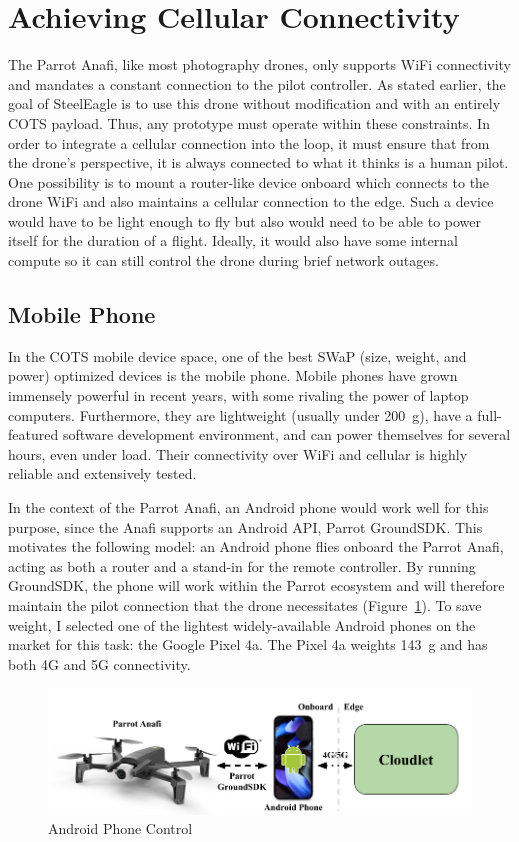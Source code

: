 \section{Achieving Cellular Connectivity}
\label{sec:achieving-cell-conn}
The Parrot Anafi, like most photography drones, only supports WiFi connectivity and mandates a constant connection to the pilot controller. As stated earlier, the goal of SteelEagle is to use this drone without modification and with an entirely COTS payload.  Thus, any prototype must operate within these constraints. In order to integrate a cellular connection into the loop, it must ensure that from the drone's perspective, it is always connected to what it thinks is a human pilot. One possibility is to mount a router-like device onboard which connects to the drone WiFi and also maintains a cellular connection to the edge. Such a device would have to be light enough to fly but also would need to be able to power itself for the duration of a flight. Ideally, it would also have some internal compute so it can still control the drone during brief network outages.

\subsection{Mobile Phone}
In the COTS mobile device space, one of the best SWaP (size, weight, and power) optimized devices is the mobile phone. Mobile phones have grown immensely powerful in recent years, with some rivaling the power of laptop computers. Furthermore, they are lightweight (usually under 200~g), have a full-featured software development environment, and can power themselves for several hours, even under load. Their connectivity over WiFi and cellular is highly reliable and extensively tested.

In the context of the Parrot Anafi, an Android phone would work well for this purpose, since the Anafi supports an Android API, Parrot GroundSDK. This motivates the following model: an Android phone flies onboard the Parrot Anafi, acting as both a router and a stand-in for the remote controller. By running GroundSDK, the phone will work within the Parrot ecosystem and will therefore maintain the pilot connection that the drone necessitates (Figure~\ref{fig:phone-control}). To save weight, I selected one of the lightest widely-available Android phones on the market for this task: the Google Pixel 4a. The Pixel 4a weights 143~g and has both 4G and 5G connectivity.

\begin{figure}
    \centering
    \includegraphics[width=1.0\linewidth]{chapter3/FIGS/onboard-phone.png}
    \caption{Android Phone Control~\cite{ParrotAnafi}}
    \label{fig:phone-control}
\end{figure}

